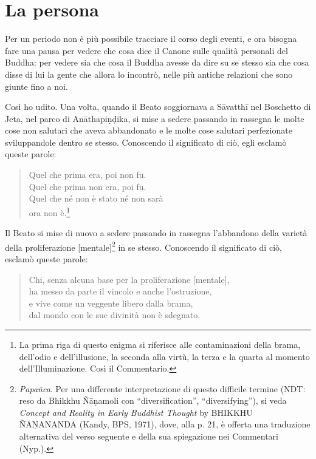 \chapter{La persona}

 Per un periodo non è più possibile tracciare il corso
degli eventi, e ora bisogna fare una pausa per vedere che cosa dice il
Canone sulle qualità personali del Buddha: per vedere sia che cosa il
Buddha avesse da dire su se stesso sia che cosa disse di lui la gente
che allora lo incontrò, nelle più antiche relazioni che sono giunte fino
a noi.


 Così ho udito. Una volta, quando il Beato soggiornava a
Sāvatthī nel Boschetto di Jeta, nel parco di Anāthapiṇḍika, si mise a
sedere passando in rassegna le molte cose non salutari che aveva
abbandonato e le molte cose salutari perfezionate sviluppandole dentro
se stesso. Conoscendo il significato di ciò, egli esclamò queste parole:


\begin{quote}
Quel che prima era, poi non fu. \\
Quel che prima non era, poi fu. \\
Quel che né non è stato né non sarà \\
ora non è.\footnote{La prima riga di questo enigma si riferisce alle contaminazioni della brama, dell’odio e dell’illusione, la seconda alla virtù, la terza e la quarta al momento dell’Illuminazione. Così il Commentario.}
\end{quote}



Il Beato si mise di nuovo a sedere passando in rassegna l’abbandono
della varietà della proliferazione [mentale]\footnote{\emph{Papañca}. Per una differente interpretazione di questo difficile termine (NDT: reso da Bhikkhu Ñāṇamoli con “diversification”, “diversifying”), si veda \emph{Concept and Reality in Early Buddhist Thought} by BHIKKHU ÑĀṆANANDA (Kandy, BPS, 1971), dove, alla p. 21, è offerta una traduzione alternativa del verso seguente e della sua spiegazione nei Commentari (Nyp.).} in se
stesso. Conoscendo il significato di ciò, esclamò queste parole:


\begin{quote}
Chi, senza alcuna base per la proliferazione [mentale], \\
ha messo da parte il vincolo e anche l’ostruzione, \\
e vive come un veggente libero dalla brama, \\
dal mondo con le sue divinità non è sdegnato.
\end{quote}

